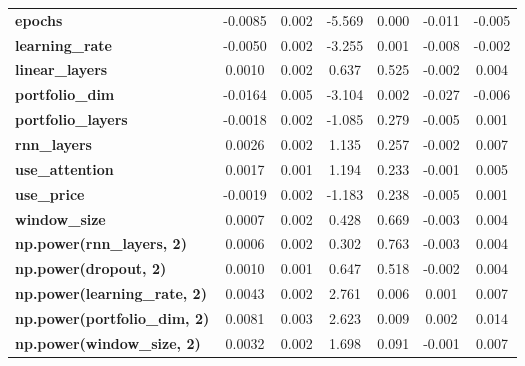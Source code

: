 \begin{center}
\begin{tabular}{lcccccc}
\textbf{epochs}                            &      -0.0085  &        0.002     &    -5.569  &         0.000        &       -0.011    &       -0.005     \\
\textbf{learning\_rate}                    &      -0.0050  &        0.002     &    -3.255  &         0.001        &       -0.008    &       -0.002     \\
\textbf{linear\_layers}                    &       0.0010  &        0.002     &     0.637  &         0.525        &       -0.002    &        0.004     \\
\textbf{portfolio\_dim}                    &      -0.0164  &        0.005     &    -3.104  &         0.002        &       -0.027    &       -0.006     \\
\textbf{portfolio\_layers}                 &      -0.0018  &        0.002     &    -1.085  &         0.279        &       -0.005    &        0.001     \\
\textbf{rnn\_layers}                       &       0.0026  &        0.002     &     1.135  &         0.257        &       -0.002    &        0.007     \\
\textbf{use\_attention}                    &       0.0017  &        0.001     &     1.194  &         0.233        &       -0.001    &        0.005     \\
\textbf{use\_price}                        &      -0.0019  &        0.002     &    -1.183  &         0.238        &       -0.005    &        0.001     \\
\textbf{window\_size}                      &       0.0007  &        0.002     &     0.428  &         0.669        &       -0.003    &        0.004     \\
\textbf{np.power(rnn\_layers, 2)}          &       0.0006  &        0.002     &     0.302  &         0.763        &       -0.003    &        0.004     \\
\textbf{np.power(dropout, 2)}              &       0.0010  &        0.001     &     0.647  &         0.518        &       -0.002    &        0.004     \\
\textbf{np.power(learning\_rate, 2)}       &       0.0043  &        0.002     &     2.761  &         0.006        &        0.001    &        0.007     \\
\textbf{np.power(portfolio\_dim, 2)}       &       0.0081  &        0.003     &     2.623  &         0.009        &        0.002    &        0.014     \\
\textbf{np.power(window\_size, 2)}         &       0.0032  &        0.002     &     1.698  &         0.091        &       -0.001    &        0.007     \\

\end{tabular}
\end{center}

